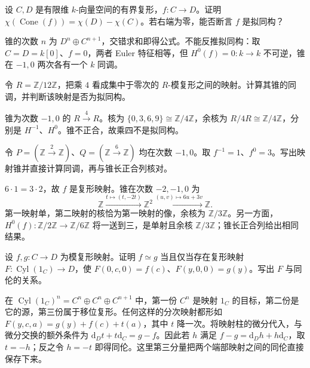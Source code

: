\begin{exercise}\label{b4:ex:06-cone-euler}
	设 \(C,D\) 是有限维 \(k\)-向量空间的有界复形，\(f:C\to D\)。证明 \(\chi(\operatorname{Cone}(f))=\chi(D)-\chi(C)\)。若右端为零，能否断言 \(f\) 是拟同构？
\end{exercise}
\begin{solution}
	锥的次数 \(n\) 为 \(D^n\oplus C^{n+1}\)，交错求和即得公式。不能反推拟同构：取 \(C=D=k[0]\)、\(f=0\)，两者 Euler 特征相等，但 \(H^0(f)=0:k\to k\) 不可逆，锥在 \(-1,0\) 两次各有一个 \(k\) 同调。
\end{solution}

\begin{exercise}\label{b4:ex:06-cone-residue}
	令 \(R=\mathbb Z/12\mathbb Z\)，把乘 \(4\) 看成集中于零次的 \(R\)-模复形之间的映射。计算其锥的同调，并判断该映射是否为拟同构。
\end{exercise}
\begin{solution}
	锥为次数 \(-1,0\) 的 \(R\xrightarrow4R\)。核为 \(\{0,3,6,9\}\cong\mathbb Z/4\mathbb Z\)，余核为 \(R/4R\cong\mathbb Z/4\mathbb Z\)，分别是 \(H^{-1}\)、\(H^0\)。锥不正合，故乘四不是拟同构。
\end{solution}

\begin{exercise}\label{b4:ex:06-cone-comparison-integers}
	令 \(P=(\mathbb Z\xrightarrow2\mathbb Z)\)、\(Q=(\mathbb Z\xrightarrow6\mathbb Z)\) 均在次数 \(-1,0\)。取 \(f^{-1}=1\)、\(f^0=3\)。写出映射锥并直接计算同调，再与锥长正合列核对。
\end{exercise}
\begin{solution}
	\(6\cdot1=3\cdot2\)，故 \(f\) 是复形映射。锥在次数 \(-2,-1,0\) 为
	\[
		\mathbb Z\xrightarrow{t\mapsto(t,-2t)}\mathbb Z^2 \xrightarrow{(u,v)\mapsto6u+3v}\mathbb Z.
	\]
	第一映射单，第二映射的核恰为第一映射的像，余核为 \(\mathbb Z/3\mathbb Z\)。另一方面，\(H^0(f):\mathbb Z/2\mathbb Z\to\mathbb Z/6\mathbb Z\) 将一送到三，是单射且余核 \(\mathbb Z/3\mathbb Z\)；锥长正合列给出相同结果。
\end{solution}

\begin{exercise}\label{b4:ex:06-cylinder-homotopies}
	设 \(f,g:C\to D\) 为模复形映射。证明 \(f\simeq g\) 当且仅当存在复形映射 \(F:\operatorname{Cyl}(1_C)\to D\)，使 \(F(0,c,0)=f(c)\)、\(F(y,0,0)=g(y)\)。写出 \(F\) 与同伦的关系。
\end{exercise}
\begin{solution}
	在 \(\operatorname{Cyl}(1_C)^n=C^n\oplus C^n\oplus C^{n+1}\) 中，第一份 \(C^n\) 是映射 \(1_C\) 的目标，第二份是它的源，第三份属于移位复形。任何这样的分次映射都形如 \(F(y,c,a)=g(y)+f(c)+t(a)\)，其中 \(t\) 降一次。将映射柱的微分代入，与微分交换的额外条件为 \(\mathrm{d}_Dt+t\mathrm{d}_C=g-f\)。因此若 \(h\) 满足 \(f-g=\mathrm{d}_Dh+h\mathrm{d}_C\)，取 \(t=-h\)；反之令 \(h=-t\) 即得同伦。这里第三分量把两个端部映射之间的同伦直接保存下来。
\end{solution}

